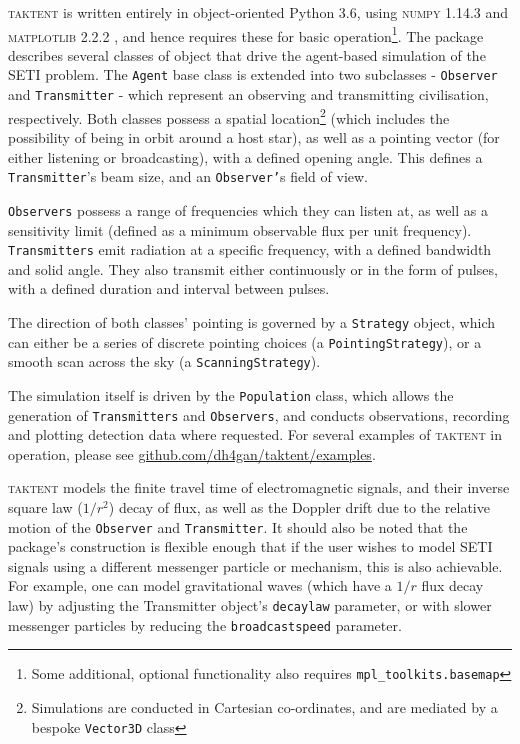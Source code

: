 \documentclass[RNAAS]{aastex62}
\begin{document}
\noindent \textsc{taktent} is written entirely in object-oriented Python 3.6, using \textsc{numpy} 1.14.3 \citep{Oliphant2006} and \textsc{matplotlib} 2.2.2 \citep{Hunter2007}, and hence requires these for basic operation\footnote{Some additional, optional functionality also requires \texttt{mpl\_toolkits.basemap}}.  The package describes several classes of object that drive the agent-based simulation of the SETI problem.  The \texttt{Agent} base class is extended into two subclasses - \texttt{Observer} and \texttt{Transmitter} - which represent an observing and transmitting civilisation, respectively.  Both classes possess a spatial location\footnote{Simulations are conducted in Cartesian co-ordinates, and are mediated by a bespoke \texttt{Vector3D} class} (which includes the possibility of being in orbit around a host star), as well as a pointing vector (for either listening or broadcasting), with a defined opening angle.  This defines a \texttt{Transmitter}'s beam size, and an \texttt{Observer'}s field of view.

\texttt{Observers} possess a range of frequencies which they can listen at, as well as a sensitivity limit (defined as a minimum observable flux per unit frequency).  \texttt{Transmitters} emit radiation at a specific frequency, with a defined bandwidth and solid angle.  They also transmit either continuously or in the form of pulses, with a defined duration and interval between pulses.

The direction of both classes' pointing is governed by a \texttt{Strategy} object, which can either be a series of discrete pointing choices (a \texttt{PointingStrategy}), or a smooth scan across the sky (a \texttt{ScanningStrategy}).

The simulation itself is driven by the \texttt{Population} class, which allows the generation of \texttt{Transmitters} and \texttt{Observers}, and conducts observations, recording and plotting detection data where requested.  For several examples of \textsc{taktent} in operation, please see \url{github.com/dh4gan/taktent/examples}.

\textsc{taktent} models the finite travel time of electromagnetic signals, and their inverse square law ($1/r^2$) decay of flux, as well as the Doppler drift due to the relative motion of the \texttt{Observer} and \texttt{Transmitter}.  It should also be noted that the package's construction is flexible enough that if the user wishes to model SETI signals using a different messenger particle or mechanism, this is also achievable.  For example, one can model gravitational waves (which have a $1/r$ flux decay law) by adjusting the Transmitter object's \texttt{decaylaw} parameter, or with slower messenger particles by reducing the \texttt{broadcastspeed} parameter.
\end{document}
